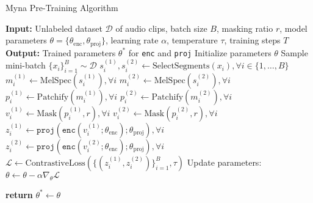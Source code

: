 \begin{algorithm}[t]
\caption{Myna Pre-Training Algorithm}
\label{alg:myna}
\begin{algorithmic}[1]
    \STATE \textbf{Input:} Unlabeled dataset $\mathcal{D}$ of audio clips, batch size $B$, masking ratio $r$, model parameters $\theta = \{\theta_{\mathrm{enc}}, \theta_{\mathrm{proj}}\}$, learning rate $\alpha$, temperature $\tau$, training steps $T$
    \STATE \textbf{Output:} Trained parameters $\theta^*$ for \texttt{enc} and \texttt{proj}
    \STATE Initialize parameters $\theta$
        \STATE Sample mini-batch $\{x_i\}_{i=1}^{B} \sim \mathcal{D}$
        \STATE $s_i^{(1)}, s_i^{(2)} \leftarrow \mathrm{SelectSegments}(x_i), \forall i \in \{1, \dots, B\}$
        \STATE $m_i^{(1)} \leftarrow \mathrm{MelSpec}(s_i^{(1)}), \forall i$
        \STATE $m_i^{(2)} \leftarrow \mathrm{MelSpec}(s_i^{(2)}), \forall i$
        \STATE $p_i^{(1)} \leftarrow \mathrm{Patchify}(m_i^{(1)}), \forall i$
        \STATE $p_i^{(2)} \leftarrow \mathrm{Patchify}(m_i^{(2)}), \forall i$
        \STATE $v_i^{(1)} \leftarrow \mathrm{Mask}(p_i^{(1)}, r), \forall i$
        \STATE $v_i^{(2)} \leftarrow \mathrm{Mask}(p_i^{(2)}, r), \forall i$
        \STATE $z_i^{(1)} \leftarrow \texttt{proj}(\texttt{enc}(v_i^{(1)}; \theta_{\mathrm{enc}}); \theta_{\mathrm{proj}}), \forall i$
        \STATE $z_i^{(2)} \leftarrow \texttt{proj}(\texttt{enc}(v_i^{(2)}; \theta_{\mathrm{enc}}); \theta_{\mathrm{proj}}), \forall i$
        \STATE $\mathcal{L} \leftarrow \mathrm{ContrastiveLoss}(\{(z_i^{(1)}, z_i^{(2)})\}_{i=1}^{B}, \tau)$
        \STATE Update parameters: \\
        \STATE $\theta \leftarrow \theta - \alpha \nabla_{\theta}\mathcal{L}$ %

    \ENDFOR
    \STATE \textbf{return} $\theta^* \leftarrow \theta$
\end{algorithmic}
\end{algorithm}
